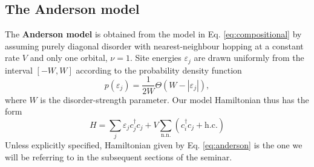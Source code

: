 \documentclass[10pt,a4paper]{article}
\begin{document}
\subsection{The Anderson model}
\label{sec:and}
\noindent The \textbf{Anderson model} \cite{Anderson} is obtained from the model in Eq. \eqref{eq:compositional} by assuming purely diagonal disorder with 
nearest-neighbour hopping at a constant rate $V$ and only one orbital, $\nu=1$. Site
energies  $\varepsilon_j$ are drawn uniformly from the interval $[-W,W]$ according to the probability density function 
\begin{equation}\label{eq:probability}
p(\varepsilon_j)=\frac{1}{2W}\Theta(W-|\varepsilon_j|),
\end{equation}
where $W$ is the disorder-strength parameter. Our model Hamiltonian thus has the form 
\begin{equation}\label{eq:anderson}
H=\sum\limits_j \varepsilon_j c^\dagger_jc_j + V\sum\limits_{\text{n.n.}} \left(c^\dagger_{i}c_j + \text{h.c.}\right)
\end{equation}
Unless explicitly specified, Hamiltonian given by Eq. \eqref{eq:anderson} is the one we will be referring to in the subsequent sections of the seminar. \\\\
\noindent 
\end{document}
